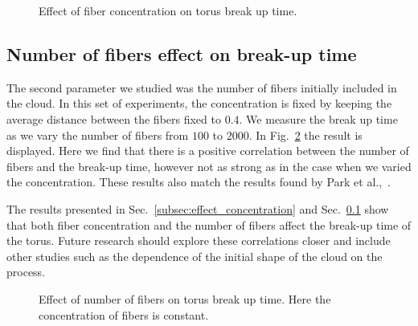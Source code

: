 \begin{figure}[!htbp]
  \centering
  \caption[Effect of fiber concentration on torus break up time.]{Effect of fiber concentration on torus break up time.}
  \label{fig:concentration_breakup}
\end{figure}

\subsection{Number of fibers effect on break-up time}
\label{subsec:effect_number}

The second parameter we studied was the number of fibers initially included in the cloud. In this set of experiments, the concentration is fixed by keeping the average distance between the fibers fixed to $0.4$. We measure the break up time as we vary the number of fibers from $100$ to $2000$. In Fig.~\ref{fig:number_breakup} the result is displayed. Here we find that there is a positive correlation between the number of fibers and the break-up time, however not as strong as in the case when we varied the concentration. These results also match the results found by Park et al.,~\cite{Park2010}.

The results presented in Sec.~\ref{subsec:effect_concentration} and Sec.~\ref{subsec:effect_number} show that both fiber concentration and the number of fibers affect the break-up time of the torus. Future research should explore these correlations closer and include other studies such as the dependence of the initial shape of the cloud on the process.

\begin{figure}[!htbp]
  \centering
  \caption[Effect of number of fibers on torus break up time.]{Effect of number of fibers on torus break up time. Here the concentration of fibers is constant.}
  \label{fig:number_breakup}
\end{figure}


